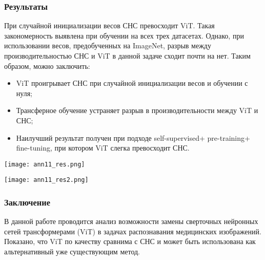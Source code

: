 \subsubsection*{Результаты}
При случайной инициализации весов СНС превосходит ViT. Такая 
закономерность выявлена при обучении на всех трех датасетах.
Однако, при использовании весов, предобученных на ImageNet, 
разрыв между производительностью СНС и ViT в данной задаче 
сходит почти на нет.  Таким образом, можно заключить:
\begin{itemize}
    \item ViT проигрывает СНС при случайной инициализации 
    весов и обучении с нуля;
    \item Трансферное обучение устраняет разрыв в производительности
    между ViT и СНС;
    \item Наилучший результат получен при подходе self-supervised+
    pre-training+ fine-tuning, при котором ViT слегка превосходит СНС.
\end{itemize}



\begin{minipage}{1.0\linewidth}
    \begin{center}
        \texttt{[image: ann11\_res.png]} \\
    \end{center}
    
\end{minipage}

\begin{minipage}{1.0\linewidth}
    \begin{center}
        \texttt{[image: ann11\_res2.png]} \\
    \end{center}
    
\end{minipage}

\subsubsection*{Заключение}
В данной работе проводится анализ возможности замены сверточных
нейронных сетей трансформерами (ViT) в задачах распознавания
медицинских изображений. Показано, что ViT по качеству сравнима 
с СНС и может быть использована как альтернативный уже существующим метод.
